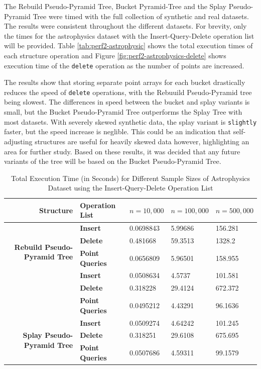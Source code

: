 The Rebuild Pseudo-Pyramid Tree, Bucket Pyramid-Tree and the Splay Pseudo-Pyramid Tree were timed with the full collection of synthetic and real datasets. The results were consistent throughout the different datasets. For brevity, only the times for the astrophysics dataset with the Insert-Query-Delete operation list will be provided. Table \ref{tab:perf2-astrophysic} shows the total execution times of each structure operation and Figure \ref{fig:perf2-astrophysics-delete} shows execution time of the \texttt{delete} operation as the number of points are increased.

The results show that storing separate point arrays for each bucket drastically reduces the speed of \texttt{delete} operations, with the Rebuuild Pseudo-Pyramid tree being slowest. The differences in speed between the bucket and splay variants is small, but the Bucket Pseudo-Pyramid Tree outperforms the Splay Tree with most datasets. With severely skewed synthetic data, the splay variant is \texttt{slightly} faster, but the speed increase is neglible. This could be an indication that self-adjusting structures are useful for heavily skewed data however, highlighting an area for further study. Based on these results, it was decided that any future variants of the tree will be based on the Bucket Pseudo-Pyramid Tree.

\begin{table}
	\centering
	\begin{tabular}{|r|l|l|l|l|}
		\hline
		\textbf{Structure} & \textbf{Operation List} & $n = 10,000$ & $n = 100,000$ & $n = 500,000$ \\
		\hline
		\multirow{ 4}{*}{\textbf{Rebuild Pseudo-Pyramid Tree}} & \textbf{Insert} & 0.0698843 & 5.99686 & 156.281 \\
		 & \textbf{Delete} & 0.481668 & 59.3513 & 1328.2 \\
		 & \textbf{Point Queries} & 0.0656809 & 5.96501 & 158.955 \\
		\hline
		\multirow{ 4}{*}{\textbf{Bucket Pseudo-Pyramid Tree}} & \textbf{Insert} & 0.0508634 & 4.5737 & 101.581 \\
		 & \textbf{Delete} & 0.318228 & 29.4124 & 672.372 \\
		 & \textbf{Point Queries} & 0.0495212 & 4.43291 & 96.1636 \\
		\hline
		\multirow{ 4}{*}{\textbf{Splay Pseudo-Pyramid Tree}} & \textbf{Insert} & 0.0509274 & 4.64242 & 101.245 \\
		 & \textbf{Delete} & 0.318251 & 29.6108 & 675.695 \\
		 & \textbf{Point Queries} & 0.0507686 & 4.59311 & 99.1579 \\
		\hline
	\end{tabular}
	\caption{Total Execution Time (in Seconds) for Different Sample Sizes of Astrophysics Dataset using the Insert-Query-Delete Operation List}
	\label{tab:perf2-astrophysics}
\end{table}

